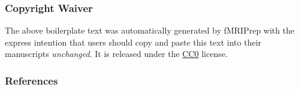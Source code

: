\documentclass[
]{article}
\begin{document}
\hypertarget{copyright-waiver}{%
\subsubsection{Copyright Waiver}\label{copyright-waiver}}

The above boilerplate text was automatically generated by fMRIPrep with
the express intention that users should copy and paste this text into
their manuscripts \emph{unchanged}. It is released under the
\href{https://creativecommons.org/publicdomain/zero/1.0/}{CC0} license.

\hypertarget{references}{%
\subsubsection{References}\label{references}}

  
\end{document}
